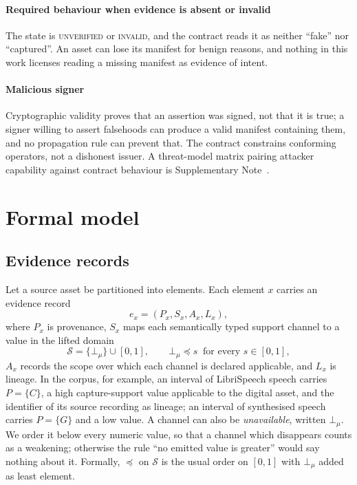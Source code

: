 \documentclass[preprint,3p,11pt,authoryear]{elsarticle}
\newcommand{\C}{\ensuremath{C}}
\newcommand{\G}{\ensuremath{G}}
\begin{document}
\paragraph{Required behaviour when evidence is absent or invalid} The state is
\textsc{unverified} or \textsc{invalid}, and the contract reads it as neither
``fake'' nor ``captured''. An asset can lose its manifest for benign reasons, and nothing in this work licenses reading a missing manifest as
evidence of intent.

\paragraph{Malicious signer} Cryptographic validity proves that an assertion
was signed, not that it is true; a signer willing to assert falsehoods can
produce a valid manifest containing them, and no propagation rule can prevent
that. The contract constrains conforming operators, not a dishonest issuer. A
threat-model matrix pairing attacker capability against contract behaviour is
Supplementary Note~\NoteThreat{}.

\section{Formal model}
\label{sec:model}

\subsection{Evidence records}

Let a source asset be partitioned into elements. Each element $x$ carries an
evidence record
\begin{equation}
e_x = (P_x, S_x, A_x, L_x),
\end{equation}
where $P_x$ is provenance, $S_x$ maps each semantically typed support channel
to a value in the lifted domain
\begin{equation}
\mathcal{S} = \{\bot_{\mu}\} \cup [0,1],
\qquad \bot_{\mu} \preceq s \ \text{ for every } s \in [0,1],
\label{eq:supportdomain}
\end{equation}
$A_x$ records the scope over which each channel is declared applicable, and
$L_x$ is lineage. In the corpus, for example, an interval of LibriSpeech speech
carries $P=\{\C\}$, a high capture-support value applicable to the digital
asset, and the identifier of its source recording as lineage; an interval of
synthesised speech carries $P=\{\G\}$ and a low value. A channel can also be
\emph{unavailable}, written $\bot_{\mu}$. We order it below every numeric value,
so that a channel which disappears counts as a weakening; otherwise the rule
``no emitted value is greater'' would say nothing about it. Formally, $\preceq$
on $\mathcal{S}$ is the usual order on $[0,1]$ with $\bot_{\mu}$ added as least
element.
\end{document}
